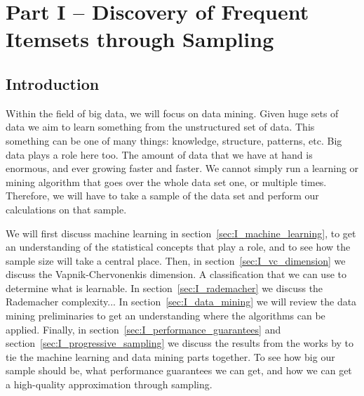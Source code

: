 \documentclass[../main.tex]{subfiles}
\begin{document}

\section*{Part I -- Discovery of Frequent Itemsets through Sampling}
\setcounter{section}{1}
\setcounter{subsection}{0}

\subsection{Introduction}
\label{sec:I_intro}

Within the field of big data, we will focus on data mining.
Given huge sets of data we aim to learn something from the unstructured set of data.
This something can be one of many things: knowledge, structure, patterns, etc.
Big data plays a role here too. The amount of data that we have at hand is enormous, and ever growing faster and faster.
We cannot simply run a learning or mining algorithm that goes over the whole data set one, or multiple times.
Therefore, we will have to take a sample of the data set and perform our calculations on that sample.


We will first discuss machine learning in section~\ref{sec:I_machine_learning},
to get an understanding of the statistical concepts that play a role, and to see how the sample size will take a central place.
Then, in section~\ref{sec:I_vc_dimension} we discuss the Vapnik-Chervonenkis dimension.
A classification that we can use to determine what is learnable.
In section~\ref{sec:I_rademacher} we discuss the Rademacher complexity...
In section~\ref{sec:I_data_mining} we will review the data mining preliminaries to get an understanding where the algorithms can be applied.
Finally, in section~\ref{sec:I_performance_guarantees} and section~\ref{sec:I_progressive_sampling} we discuss the results from the works by \citeauthor{Riondato2012} \cite{Riondato2012, Riondato2015} to tie the machine learning and data mining parts together.
To see how big our sample should be, what performance guarantees we can get, and how we can get a high-quality approximation through sampling.
\end{document}
